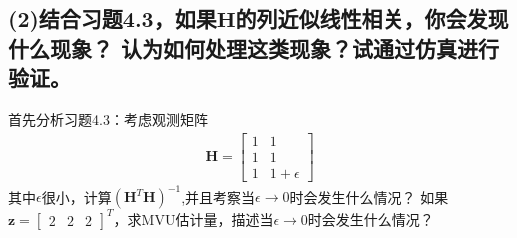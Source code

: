 \documentclass[fontset=windows]{article}
\numberwithin{figure}{section}
\begin{document}
\subsection*{(2)结合习题4.3，如果\(\mathbf{H}\)的列近似线性相关，你会发现什么现象？
	认为如何处理这类现象？试通过仿真进行验证。}
首先分析习题4.3：考虑观测矩阵
\begin{align*}
	\mathbf{H}=
	\begin{bmatrix}
		1 & 1          \\
		1 & 1          \\
		1 & 1+\epsilon
	\end{bmatrix}
\end{align*}
其中\(\epsilon\)很小，计算\((\mathbf{H}^T\mathbf{H})^{-1}\),并且考察当\(\epsilon \to 0\)时会发生什么情况？
如果\(\mathbf{z}=\begin{bmatrix}2&2&2\end{bmatrix}^T\)，求MVU估计量，描述当\(\epsilon \to 0\)时会发生什么情况？
\end{document}
